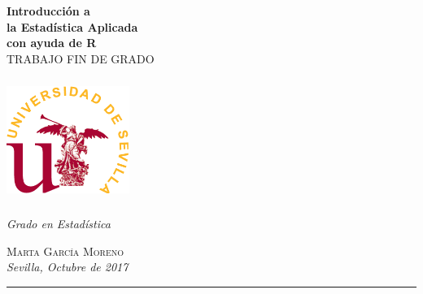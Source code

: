 %
\begin{titlepage}

\vspace*{1cm}


\noindent \textbf{\Huge Introducción a \\[0.6\baselineskip]
la Estadística Aplicada\\[0.6\baselineskip] 
con ayuda de R}\\[3\baselineskip] %
	
{\LARGE \noindent\textsc{TRABAJO FIN DE GRADO}}

\vspace*{2cm}


\includegraphics[width=4cm,height=4cm]{logo} %

\bigskip

{\LARGE \noindent \textit{Grado en Estadística}}




\null\vfill
\vspace*{1cm}
\noindent
\hfill
\begin{minipage}{0.55\linewidth}
    \begin{flushright}
        {\Large
        \textsc{Marta García Moreno}\\[\baselineskip]
        \textit{Sevilla, Octubre de 2017}
        }
    \end{flushright}
\end{minipage}
%
\begin{minipage}{0.02\linewidth}
    \rule{1pt}{125pt}
\end{minipage}
\titlepagedecoration

\vfill %

\cleardoublepage
\thispagestyle{empty}
\end{titlepage}


\raggedbottom


% 